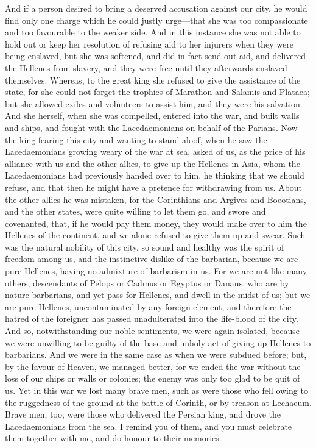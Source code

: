 \documentclass[11pt,letter]{article}
\begin{document}
\par  And if a person desired to bring a deserved accusation against our city, he would find only one charge which he could justly urge—that she was too compassionate and too favourable to the weaker side. And in this instance she was not able to hold out or keep her resolution of refusing aid to her injurers when they were being enslaved, but she was softened, and did in fact send out aid, and delivered the Hellenes from slavery, and they were free until they afterwards enslaved themselves. Whereas, to the great king she refused to give the assistance of the state, for she could not forget the trophies of Marathon and Salamis and Plataea; but she allowed exiles and volunteers to assist him, and they were his salvation. And she herself, when she was compelled, entered into the war, and built walls and ships, and fought with the Lacedaemonians on behalf of the Parians. Now the king fearing this city and wanting to stand aloof, when he saw the Lacedaemonians growing weary of the war at sea, asked of us, as the price of his alliance with us and the other allies, to give up the Hellenes in Asia, whom the Lacedaemonians had previously handed over to him, he thinking that we should refuse, and that then he might have a pretence for withdrawing from us. About the other allies he was mistaken, for the Corinthians and Argives and Boeotians, and the other states, were quite willing to let them go, and swore and covenanted, that, if he would pay them money, they would make over to him the Hellenes of the continent, and we alone refused to give them up and swear. Such was the natural nobility of this city, so sound and healthy was the spirit of freedom among us, and the instinctive dislike of the barbarian, because we are pure Hellenes, having no admixture of barbarism in us. For we are not like many others, descendants of Pelops or Cadmus or Egyptus or Danaus, who are by nature barbarians, and yet pass for Hellenes, and dwell in the midst of us; but we are pure Hellenes, uncontaminated by any foreign element, and therefore the hatred of the foreigner has passed unadulterated into the life-blood of the city. And so, notwithstanding our noble sentiments, we were again isolated, because we were unwilling to be guilty of the base and unholy act of giving up Hellenes to barbarians. And we were in the same case as when we were subdued before; but, by the favour of Heaven, we managed better, for we ended the war without the loss of our ships or walls or colonies; the enemy was only too glad to be quit of us. Yet in this war we lost many brave men, such as were those who fell owing to the ruggedness of the ground at the battle of Corinth, or by treason at Lechaeum. Brave men, too, were those who delivered the Persian king, and drove the Lacedaemonians from the sea. I remind you of them, and you must celebrate them together with me, and do honour to their memories.
\end{document}
